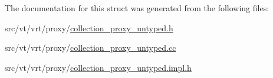 The documentation for this struct was generated from the following files\+:\begin{DoxyCompactItemize}
\item 
src/vt/vrt/proxy/\hyperlink{collection__proxy__untyped_8h}{collection\+\_\+proxy\+\_\+untyped.\+h}\item 
src/vt/vrt/proxy/\hyperlink{collection__proxy__untyped_8cc}{collection\+\_\+proxy\+\_\+untyped.\+cc}\item 
src/vt/vrt/proxy/\hyperlink{collection__proxy__untyped_8impl_8h}{collection\+\_\+proxy\+\_\+untyped.\+impl.\+h}\end{DoxyCompactItemize}
